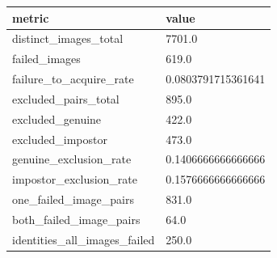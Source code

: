 \begin{table}
\centering
\begin{tabular}{ll}
\toprule
metric & value \\
\midrule
distinct_images_total & 7701.0 \\
failed_images & 619.0 \\
failure_to_acquire_rate & 0.0803791715361641 \\
excluded_pairs_total & 895.0 \\
excluded_genuine & 422.0 \\
excluded_impostor & 473.0 \\
genuine_exclusion_rate & 0.1406666666666666 \\
impostor_exclusion_rate & 0.1576666666666666 \\
one_failed_image_pairs & 831.0 \\
both_failed_image_pairs & 64.0 \\
identities_all_images_failed & 250.0 \\
\bottomrule
\end{tabular}
\end{table}